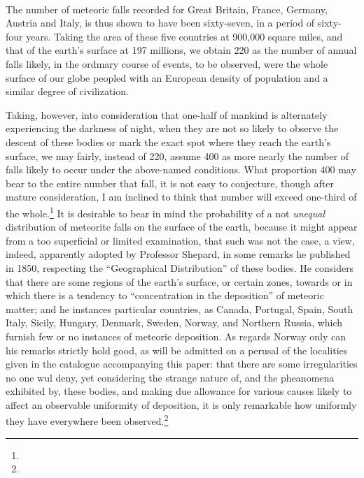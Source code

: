 \documentclass[a4paper, 12pt, oneside]{article}
\begin{document}
\paragraph{}
The number of meteoric falls recorded for Great Britain, France, Germany, Austria and Italy, is thus shown to have been sixty-seven, in a period of sixty-four years. Taking the area of these five countries at 900,000 square miles, and that of the earth's surface at 197 millions, we obtain 220 as the number of annual falls likely, in the ordmary course of events, to be observed, were the whole surface of our globe peopled with an European density of population and a similar degree of civilization.

Taking, however, into consideration that one-half of mankind is alternately experiencing the darkness of night, when they are not so likely to observe the descent of these bodies or mark the exact spot where they reach the earth's surface, we may fairly, instead of 220, assume 400 as more nearly the number of falls likely to occur under the above-named conditions. What proportion 400 may bear to the entire number that fall, it is not easy to conjecture, though after mature consideration, I am inclined to think that number will exceed one-third of the whole.\footnote{} It is desirable to bear in mind the probability of a not \emph{unequal} distribution of meteorite falls on the surface of the earth, because it might appear from a too superficial or limited examination, that such was not the case, a view, indeed, apparently adopted by Professor Shepard, in some remarks he published in 1850, respecting the ``Geographical Distribution'' of these bodies. He considers that there are some regions of the earth's surface, or certain zones, towards or in which there is a tendency to ``concentration in the deposition'' of meteoric matter; and he instances particular countries, as Canada, Portugal, Spain, South Italy, Sicily, Hungary, Denmark, Sweden, Norway, and Northern Russia, which furnish few or no instances of meteoric deposition. As regards Norway only can his remarks strictly hold good, as will be admitted on a perusal of the localities given in the catalogue accompanying this paper: that there are some irregularities no one wul deny, yet considering the strange nature of, and the pheanomena exhibited by, these bodies, and making due allowance for various causes likely to affect an observable uniformity of deposition, it is only remarkable how uniformly they have everywhere been observed.\footnote{}
\end{document}
